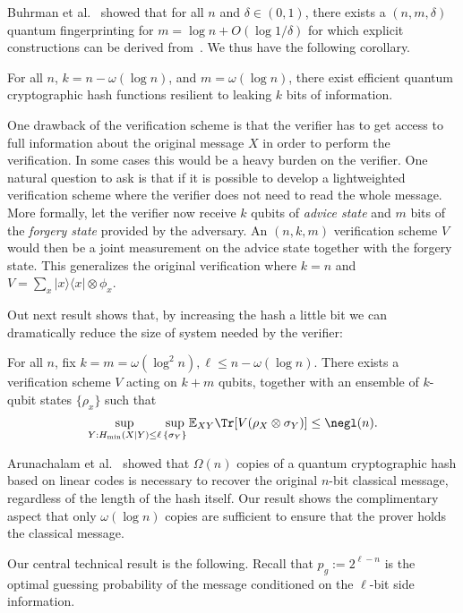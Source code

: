 Buhrman et al.~\cite{buhrman2001quantum} showed that for all $n$ and $\delta\in(0, 1)$, there exists
a $(n, m, \delta)$ quantum fingerprinting for $m=\log n+ O(\log1/\delta)$ for which explicit constructions
can be derived from~\cite{naor1993small}. We thus have the following corollary.
\begin{corollary}
For all $n$, $k=n-\omega(\log n)$, and $m=\omega(\log n)$, there exist efficient quantum cryptographic hash functions
resilient to leaking $k$ bits of information. 
\end{corollary}

One drawback of the verification scheme is that the verifier has to get access to full information about the original message $X$ in order to perform the verification. In some cases this would be a heavy burden on the verifier. One natural question to ask is that if it is possible to develop a lightweighted verification scheme where the verifier does not need to read the whole message. More formally, let the verifier now receive $k$ qubits of {\em advice state} and $m$ bits of the {\em
    forgery state} provided
by the adversary. An $(n,k,m)$ verification scheme $V$ would then be a joint measurement on the advice state together with the forgery state. This generalizes the original verification where $k=n$ and $V=\sum_{x}|x\rangle\langle x|\otimes\phi_x$.

Out next result shows that, by increasing the hash a little bit we can dramatically reduce the size of system needed by the verifier:

\begin{theorem}
    For all $n$, fix $k=m=\omega(\log^2 n), \ell\leq n-\omega(\log n)$. There exists a verification scheme $V$ acting on $k+m$ qubits, together with an ensemble of $k$-qubit states $\{\rho_x\}$ such that 
    $$\sup_{Y:H_{\min}(X|Y)\leq \ell}\sup_{\{\sigma_Y\}}\mathbb{E}_{XY}\Tr[V(\rho_X\otimes \sigma_Y)]\leq \negl(n).$$
\end{theorem}

Arunachalam et al.~\cite{arunachalam2016optimal} showed that $\Omega(n)$ copies of a quantum cryptographic hash based on linear codes is necessary to recover the original $n$-bit classical message, regardless of the length of the hash itself. Our result shows the complimentary aspect that only $\omega(\log n)$ copies are sufficient to ensure that the prover holds the classical message.

Our central technical result is the following. Recall that $p_g:=2^{\ell-n}$ is the optimal guessing probability of the message conditioned on the $\ell$-bit side information.


